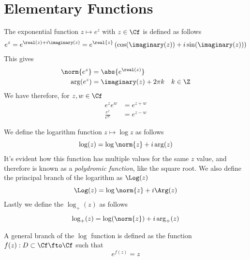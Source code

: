 \documentclass[../mmf.tex]{subfiles}
\begin{document}
\section{Elementary Functions}
\begin{dfn}[Exponential]
	The exponential function $z\mapsto e^z$ with $z\in\Cf$ is defined as follows
	\begin{equation}
		e^z=e^{\real(z)+i\imaginary(z)}=e^{\real{z}}\left( \cos(\imaginary(z))+i\sin(\imaginary(z)) \right)
		\label{eq:exponential}
	\end{equation}
	This gives
	\begin{equation}
		\begin{aligned}
			\norm{e^z}&=\abs{e^{\real(z)}}\\
			\arg(e^z)&=\imaginary(z)+2\pi k\quad k\in\Z
		\end{aligned}
		\label{eq:normexpz}
	\end{equation}
	We have therefore, for $z,w\in\Cf$
	\begin{equation}
		\begin{aligned}
			e^{z}e^w&=e^{z+w}\\
			\frac{e^z}{e^w}&=e^{z-w}
		\end{aligned}
		\label{eq:propexp}
	\end{equation}
\end{dfn}
\begin{dfn}[Logarithm]
	We define the logarithm function $z\mapsto\log{z}$ as follows
	\begin{equation}
		\log(z)=\log\norm{z}+i\arg(z)
		\label{eq:complexlog}
	\end{equation}
	It's evident how this function has multiple values for the same $z$ value, and therefore is known as a \textit{polydromic function}, like the square root.
	We also define the principal branch of the logarithm as $\Log(z)$
	\begin{equation}
		\Log(z)=\log\norm{z}+i\Arg(z)
		\label{eq:princlog}
	\end{equation}
    Lastly we define the $\log_+(z)$ as follows
\begin{equation}
    \log_+(z)=\log(\norm{z})+i\arg_+(z)
\end{equation}
\end{dfn}
\begin{dfn}
	A general branch of the $\log$ function is defined as the function $f(z):D\subset\Cf\fto\Cf$ such that
	\begin{equation}
		e^{f(z)}=z
		\label{eq:logbranchfunc}
	\end{equation}
\end{dfn}
\end{document}
